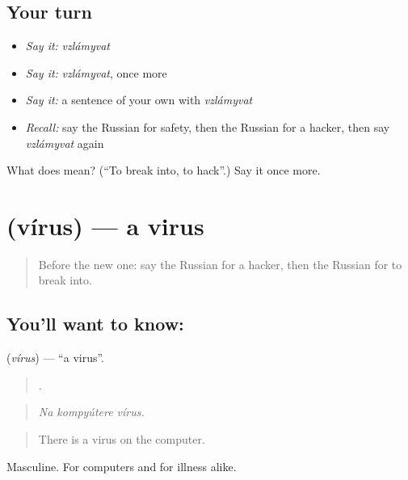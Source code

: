 \subsection*{Your turn}
\begin{itemize}
\raggedright
  \item \emph{Say it:} \emph{vzlámyvat}
  \item \emph{Say it:} \emph{vzlámyvat}, once more
  \item \emph{Say it:} a sentence of your own with \emph{vzlámyvat}
  \item \emph{Recall:} say the Russian for safety, then the Russian for a hacker, then say \emph{vzlámyvat} again
\end{itemize}

\begin{tcolorbox}[breakable,colback=teal!4,colframe=teal!35!black,title={Before you move on}]
What does  mean? (\textquotedblleft{}To break into, to hack\textquotedblright{}.) Say it once more.
\end{tcolorbox}
\section[\texorpdfstring{\ru{вирус} (vírus)}{вирус (vírus)}]{ (vírus) — a virus}

\label{lesson:RU-C400-virus}



\begin{quote}
Before the new one: say the Russian for a hacker, then the Russian for to break into.
\end{quote}

\subsection*{You'll want to know: }
\textbf{} (\emph{vírus}) — \textquotedblleft{}a virus\textquotedblright{}.

\begin{quote}
  .
\end{quote}

\begin{quote}
\emph{Na kompyútere vírus.}
\end{quote}

\begin{quote}
There is a virus on the computer.
\end{quote}

Masculine. For computers and for illness alike.

